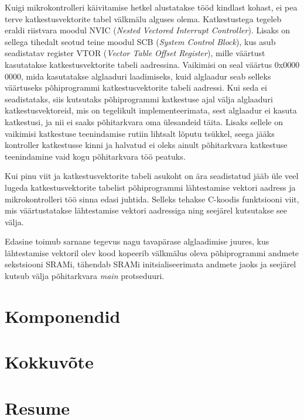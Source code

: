 \documentclass[12pt,a4paper]{article}
\begin{document}
Kuigi mikrokontrolleri käivitamise hetkel alustatakse tööd kindlast kohast, ei
pea terve katkestusvektorite tabel välkmälu alguses olema. Katkestustega tegeleb
eraldi riistvara moodul NVIC (\textit{Nested Vectored Interrupt Controller}).
Lisaks on sellega tihedalt seotud teine moodul SCB (\textit{System Control
Block}), kus asub seadistatav register VTOR (\textit{Vector Table Offset
Register}), mille väärtust kasutatakse katkestusvektorite tabeli aadressina.
\cite[ptk~4.4]{CM3pm} Vaikimisi on seal väärtus 0x0000 0000, mida kasutatakse alglaaduri
laadimiseks, kuid alglaadur seab selleks väärtuseks põhiprogrammi
katkestusvektorite tabeli aadressi. Kui seda ei seadistataks, siis kutsutaks
põhiprogrammi katkestuse ajal välja alglaaduri katkestusvektoreid, mis on
tegelikult implementeerimata, sest alglaadur ei kasuta katkestusi, ja nii ei
saaks põhitarkvara oma ülesandeid täita. Lisaks sellele on vaikimisi katkestuse
teenindamise rutiin lihtsalt lõputu tsükkel, seega jääks kontroller katkestusse
kinni ja halvatud ei oleks ainult põhitarkvara katkestuse teenindamine vaid kogu
põhitarkvara töö peatuks.

Kui pinu viit ja katkestusvektorite tabeli asukoht on ära seadistatud jääb üle
veel lugeda katkestusvektorite tabelist põhiprogrammi lähtestamise vektori
aadress ja mikrokontrolleri töö sinna edasi juhtida. Selleks tehakse C-koodis
funktsiooni viit, mis väärtustatakse lähtestamise vektori aadressiga ning
seejärel kutsutakse see välja.

Edasine toimub sarnane tegevus nagu tavapärase alglaadimise juures, kus
lähtestamise vektoril olev kood kopeerib välkmälus oleva põhiprogrammi andmete
sekstsiooni SRAMi, tähendab SRAMi initsialiseerimata andmete jaoks ja seejärel
kutsub välja põhitarkvara \textit{main} protseduuri.


\section{Komponendid}

\section{Kokkuvõte}

\section{Resume}



\end{document}
